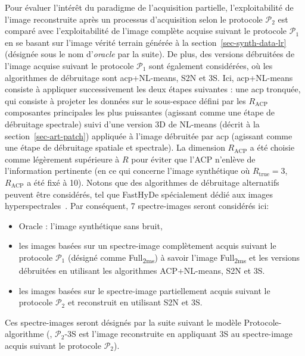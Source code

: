 Pour évaluer l'intérêt du paradigme de l'acquisition partielle, l'exploitabilité de l'image reconstruite après un processus d'acquisition selon le protocole $\mathcal{P}_2$ est comparé avec l'exploitabilité de l'image complète acquise suivant le protocole $\mathcal{P}_1$ en se basant sur l'image vérité terrain générée à la section~\ref{sec-synth-data-lr} (désignée sous le nom d'\emph{oracle} par la suite). De plus, des versions débruitées de l'image acquise suivant le protocole $\mathcal{P}_1$ sont également considérées, où les algorithmes de débruitage sont \gls{acp}+NL-means, S2N et 3S. Ici, \gls{acp}+NL-means consiste à appliquer successivement les deux étapes suivantes : une \gls{acp} tronquée, qui consiste à projeter les données sur le sous-espace défini par les $R_{\mathrm{ACP}}$ composantes principales les plus puissantes (agissant comme une étape de débruitage spectrale) suivi d'une version 3D de NL-means (décrit à la section~\ref{sec-art-patch}) appliquée à l'image débruitée par \gls{acp} (agissant comme une étape de débruitage spatiale et spectrale).
%
La dimension $R_{\mathrm{ACP}}$ a été choisie comme légèrement supérieure à $R$ pour éviter que l'ACP n'enlève de l'information pertinente (en ce qui concerne l'image synthétique où $R_{\mathrm{true}}=3$, $R_{\mathrm{ACP}}$ a été fixé à 10). Notons que des algorithmes de débruitage alternatifs peuvent être considérés, tel que FastHyDe spécialement dédié aux images hyperspectrales~\cite{bioucaspaper}. Par conséquent, 7 spectre-images seront considérés ici:
\begin{itemize}
    \item Oracle : l'image synthétique sans bruit,
    \item les images basées sur un spectre-image complètement acquis suivant le protocole $\mathcal{P}_1$ (désigné comme Full\textsubscript{2ms}) à savoir l'image Full\textsubscript{2ms} et les versions débruitées en utilisant les algorithmes ACP+NL-means, S2N et 3S.
    \item les images basées sur le spectre-image partiellement acquis suivant le protocole $\mathcal{P}_2$ et reconstruit en utilisant S2N et 3S.
\end{itemize}
Ces spectre-images seront désignés par la suite suivant le modèle Protocole-algorithme (\eg{}, $\mathcal{P}_2$-3S est l'image reconstruite en appliquant 3S au spectre-image acquis suivant le protocole $\mathcal{P}_2$).

